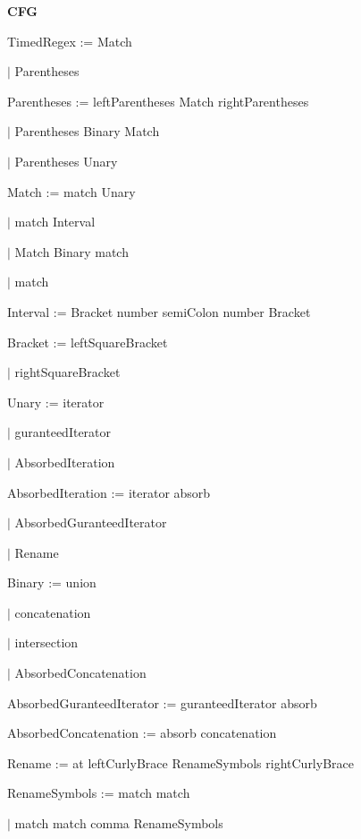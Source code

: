 
\textbf{CFG}

TimedRegex := Match

\qquad	$\mid$ Parentheses

Parentheses := leftParentheses Match rightParentheses

\qquad	$\mid$ Parentheses Binary Match

\qquad	$\mid$ Parentheses Unary

Match := match Unary

\qquad	$\mid$ match Interval

\qquad    $\mid$ Match Binary match

\qquad	$\mid$ match

Interval := Bracket number semiColon number Bracket

Bracket := leftSquareBracket

\qquad	$\mid$ rightSquareBracket

Unary := iterator

\qquad	$\mid$ guranteedIterator

\qquad	$\mid$ AbsorbedIteration

AbsorbedIteration := iterator absorb 

\qquad	$\mid$ AbsorbedGuranteedIterator

\qquad	$\mid$ Rename

Binary := union

\qquad	$\mid$ concatenation

\qquad	$\mid$ intersection

\qquad	$\mid$ AbsorbedConcatenation

AbsorbedGuranteedIterator := guranteedIterator absorb 

AbsorbedConcatenation := absorb concatenation

Rename := at leftCurlyBrace RenameSymbols rightCurlyBrace

RenameSymbols := match match

\qquad	$\mid$ match match comma RenameSymbols